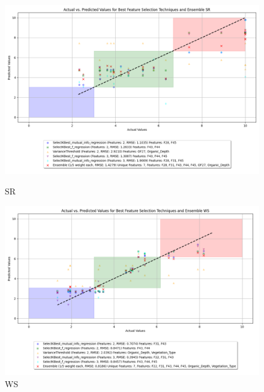 \begin{figure}[H]
    \centering
    \begin{minipage}{0.45\textwidth}
        \centering
        \includegraphics[width=\linewidth]{reg_section_specxtra/images_reg_featred_ensemble/actual_vs_predicted_smallest_feature_selection_and_ensemble_SR.png}
        \caption{SR}
        \label{fig_reg_specxtra:sr_reg_featred_smallest_ensemble}
    \end{minipage}\hfill
    \begin{minipage}{0.45\textwidth}
        \centering
        \includegraphics[width=\linewidth]{reg_section_specxtra/images_reg_featred_ensemble/actual_vs_predicted_smallest_feature_selection_and_ensemble_WS.png}
        \caption{WS}
        \label{fig_reg_specxtra:ws_reg_featred_smallest_ensemble}
    \end{minipage}
\end{figure}

